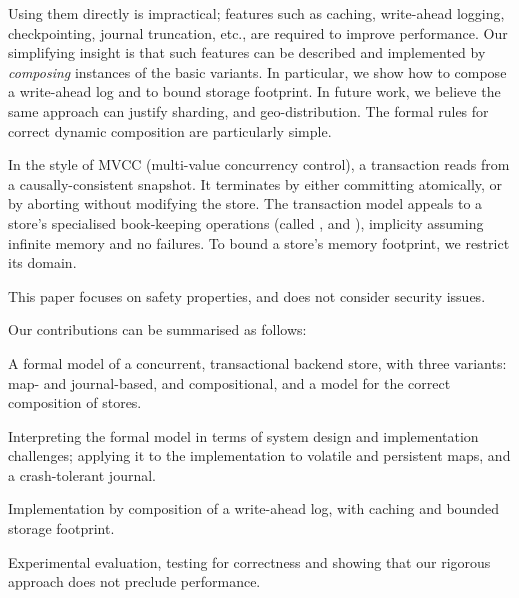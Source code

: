 Using them directly is impractical; features such as caching,
write-ahead logging, checkpointing, journal truncation, etc., are
required to improve performance.
Our simplifying insight is that such features can be described and
implemented by \emph{composing} instances of the basic variants.
In particular, we show how to compose a write-ahead log and to bound
storage footprint.
In future work, we believe the same approach can justify sharding,
and geo-distribution.
The formal rules for correct dynamic composition are particularly
simple.

% 
In the style of MVCC (multi-value concurrency control), a transaction
reads from a causally-consistent snapshot.
It terminates by either committing atomically, or by aborting without
modifying the store.
The transaction model appeals to a store's specialised
book-keeping operations (called \doUpdate{}, \doCommit{} and \lookup{}),
implicity assuming infinite memory and no failures.
To bound a store's memory footprint, we restrict its domain.


This paper focuses on safety properties, and does not consider security
issues.

Our contributions can be summarised as follows:
\begin{compactitem}
\item
  A formal model of a concurrent, transactional backend store, with
  three variants: map- and journal-based, and compositional, and a model
  for the correct composition of stores.
\item
  Interpreting the formal model in terms of system design and
  implementation challenges; applying it to the implementation to
  volatile and persistent maps, and a crash-tolerant journal.
\item
  Implementation by composition of a write-ahead log, with caching
  and bounded storage footprint.
\item
  Experimental evaluation, testing for correctness and showing that our
  rigorous approach does not preclude performance.
\end{compactitem}


